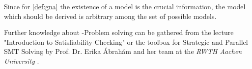 Since for \autoref{def:gna} the existence of a model is the crucial information, the model which should be derived is arbitrary among the set of possible models.

Further knowledge about -Problem solving can be gathered from the lecture "Introduction to Satisfiability Checking" or the  toolbox for Strategic and Parallel SMT Solving by Prof. Dr. Erika Ábrahám and her team at the \textit{RWTH Aachen University} \cite{corzilius2015smt}.
